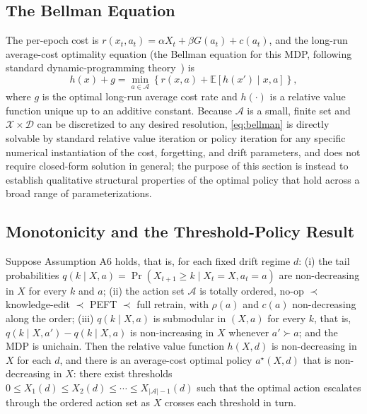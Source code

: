 \documentclass[electronics,article,submit,pdftex,moreauthors]{Definitions/mdpi}
\newcommand{\E}{\mathbb{E}}
\newcommand{\calA}{\mathcal{A}}
\newcommand{\calX}{\mathcal{X}}
\newcommand{\calD}{\mathcal{D}}
\begin{document}
\subsection{The Bellman Equation}

The per-epoch cost is $r(x_t,a_t)=\alpha X_t+\beta G(a_t)+c(a_t)$, and the long-run average-cost optimality equation (the Bellman equation for this MDP, following standard dynamic-programming theory~\cite{Bertsekas2017,Puterman1994}) is
\begin{equation}\label{eq:bellman}
h(x)+g=\min_{a\in\calA}\left\{r(x,a)+\E\left[h(x')\mid x,a\right]\right\},
\end{equation}
where $g$ is the optimal long-run average cost rate and $h(\cdot)$ is a relative value function unique up to an additive constant. Because $\calA$ is a small, finite set and $\calX\times\calD$ can be discretized to any desired resolution, \eqref{eq:bellman} is directly solvable by standard relative value iteration or policy iteration for any specific numerical instantiation of the cost, forgetting, and drift parameters, and does not require closed-form solution in general; the purpose of this section is instead to establish qualitative structural properties of the optimal policy that hold across a broad range of parameterizations.

\subsection{Monotonicity and the Threshold-Policy Result}

\begin{Proposition}\label{prop:monotone}
Suppose Assumption A6 holds, that is, for each fixed drift regime $d$: (i) the tail probabilities $q(k\mid X,a)=\Pr(X_{t+1}\ge k\mid X_t=X,a_t=a)$ are non-decreasing in $X$ for every $k$ and $a$; (ii) the action set $\calA$ is totally ordered, no-op $\prec$ knowledge-edit $\prec$ PEFT $\prec$ full retrain, with $\rho(a)$ and $c(a)$ non-decreasing along the order; (iii) $q(k\mid X,a)$ is submodular in $(X,a)$ for every $k$, that is, $q(k\mid X,a')-q(k\mid X,a)$ is non-increasing in $X$ whenever $a'\succ a$; and the MDP is unichain. Then the relative value function $h(X,d)$ is non-decreasing in $X$ for each $d$, and there is an average-cost optimal policy $a^\star(X,d)$ that is non-decreasing in $X$: there exist thresholds $0\le X_1(d)\le X_2(d)\le\cdots\le X_{|\calA|-1}(d)$ such that the optimal action escalates through the ordered action set as $X$ crosses each threshold in turn.
\end{Proposition}
\end{document}
